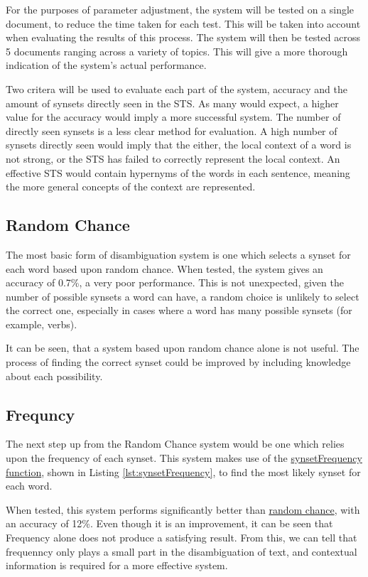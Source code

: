 \documentclass[]{article}
\begin{document}
For the purposes of parameter adjustment, the system will be tested on a single document, to reduce the time taken for each test. This will be taken into account when evaluating the results of this process. The system will then be tested across 5 documents ranging across a variety of topics. This will give a more thorough indication of the system's actual performance. 

Two critera will be used to evaluate each part of the system, accuracy and the amount of synsets directly seen in the STS. As many would expect, a higher value for the accuracy would imply a more successful system. The number of directly seen synsets is a less clear method for evaluation. A high number of synsets directly seen would imply that the either, the local context of a word is not strong, or the STS has failed to correctly represent the local context. An effective STS would contain hypernyms of the words in each sentence, meaning the more general concepts of the context are represented.

\subsection{Random Chance}
\label{sec:EvRandomChance}
The most basic form of disambiguation system is one which selects a synset for each word based upon random chance. When tested, the system gives an accuracy of 0.7\%, a very poor performance. This is not unexpected, given the number of possible synsets a word can have, a random choice is unlikely to select the correct one, especially in cases where a word has many possible synsets (for example, verbs).

It can  be seen, that a system based upon random chance alone is not useful. The process of finding the correct synset could be improved by including knowledge about each possibility.

\subsection{Frequncy}
\label{sec:EvFrequency}
The next step up from the Random Chance system would be one which relies upon the frequency of each synset. This system makes use of the \hyperref[lst:synsetFrequency]{synsetFrequency function}, shown in Listing \ref{lst:synsetFrequency}, to find the most likely synset for each word.

When tested, this system performs significantly better than \hyperref[sec:EvFrequency]{random chance}, with an accuracy of 12\%. Even though it is an improvement, it can be seen that Frequency alone does not produce a satisfying result. From this, we can tell that frequenncy only plays a small part in the disambiguation of text, and contextual information is required for a more effective system.
\end{document}
